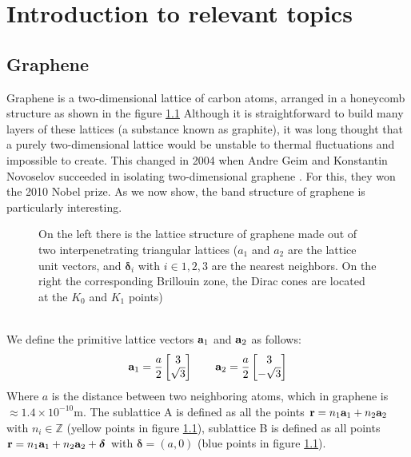 \chapter{Introduction to relevant topics}
\section{Graphene}
Graphene is a two-dimensional lattice of carbon atoms, arranged in a honeycomb structure as shown in the figure \ref{fig:graphene} Although it is straightforward to build many layers of these lattices (a substance known as graphite), it was long thought that a purely two-dimensional lattice would be unstable to thermal fluctuations and impossible to create.
This changed in 2004 when Andre Geim and Konstantin Novoselov succeeded in isolating two-dimensional graphene \cite{firstExfoliation}. For this, they won the 2010 Nobel prize. As we now show, the band structure of graphene is particularly interesting.
\begin{figure}[h]
    \caption{On the left there is the lattice structure of graphene made out of two interpenetrating triangular lattices ($a_1$ and $a_2$ are the lattice unit vectors, and $\mathbf \delta_{i}$ with $i\in {1,2,3}$ are the nearest neighbors. On the right the corresponding Brillouin zone, the Dirac cones are located at the $K_0$ and $K_1$ points) \cite{guinea2008review}}
    \label{fig:graphene}
\end{figure}\\
We define the primitive lattice vectors $\mathbf{a}_1$ and $\mathbf{a}_2$ as follows:
\begin{equation}
    \mathbf{a}_1=\frac{a}2
    \begin{bmatrix}
        3 \\ \sqrt 3
    \end{bmatrix}\quad \quad
    \mathbf{a}_2=\frac{a}2
    \begin{bmatrix}
        3 \\ -\sqrt 3
    \end{bmatrix}
\end{equation}
Where $a$ is the distance between two neighboring atoms, which in graphene is $\approx 1.4\times 10^{-10}$m. The sublattice A is defined as all the points $\mathbf{r} = n_1\mathbf{a}_1 + n_2\mathbf{a}_2$ with $n_i \in \mathbb Z$ (yellow points in figure \ref{fig:graphene}), sublattice B is defined as all points $\mathbf{r} = n_1\mathbf{a}_1 + n_2\mathbf{a}_2 + \boldsymbol\delta$ with $\boldsymbol\delta = (a, 0)$ (blue points in figure \ref{fig:graphene}).

